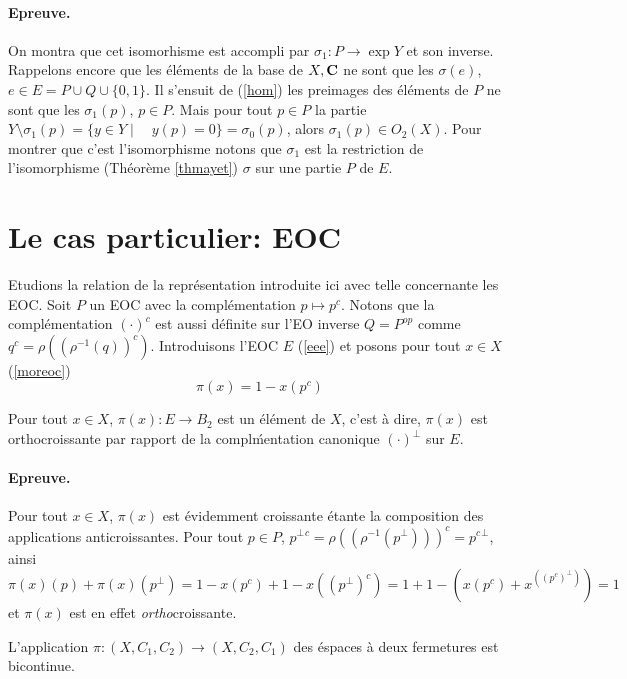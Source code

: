 \paragraph{Epreuve.} On montra que cet isomorhisme est 
accompli par $\sigma_1:P\to\exp Y$ et son inverse. Rappelons encore 
que les \'el\'ements de la base de $X,{\bf C}$ ne sont que les 
$\sigma(e)$, $e\in E=P\cup Q\cup \{0,1\}$.  Il s'ensuit de 
(\ref{hom}) les preimages des \'el\'ements de $P$ ne sont que les 
$\sigma_1(p)$, $p\in P$. Mais pour tout $p\in P$ la partie 
$Y\setminus\sigma_1(p)=\{y\in Y\mid\quad y(p)=0\}=\sigma_0(p)$, 
alors $\sigma_1(p)\in O_2(X)$.  Pour montrer que c'est 
l'isomorphisme notons que $\sigma_1$ est la restriction de 
l'isomorphisme (Th\'eor\`eme \ref{thmayet}) $\sigma$ sur une partie 
$P$ de $E$. 
\endproof 

\section{Le cas particulier: EOC} 

Etudions la relation de la repr\'esentation introduite ici avec 
telle concernante les EOC. Soit $P$ un EOC avec la 
compl\'ementation $p\mapsto p^c$. Notons que la 
compl\'ementation $(\cdot)^c$ est aussi d\'efinite sur 
l'EO inverse $Q=P^{op}$ comme $q^c=\rho((\rho^{-1}(q))^c)$. 
Introduisons l'EOC $E$ (\ref{eee}) et posons pour tout $x\in X$ 
(\ref{moreoc}) \begin{equation} \pi(x)=1-x(p^c) \label{pie} 
\end{equation} 

\begin{lemma} Pour tout $x\in X$, $\pi(x):E\to B_2$ est un 
\'el\'ement de $X$, c'est \`a dire, $\pi(x)$ est orthocroissante 
par rapport de la compl\'mentation canonique $(\cdot)^\perp$ sur 
$E$. 
\end{lemma} 

\paragraph{Epreuve.} Pour tout $x\in X$, $\pi(x)$ est \'evidemment 
croissante \'etante la composition des applications 
anticroissantes. Pour tout $p\in P$, $p^\perp{}^c = 
\rho((\rho^{-1}(p^\perp)))^c = p^c{}^\perp$, ainsi 
$\pi(x)(p)+\pi(x)(p^\perp) = 1-x(p^c)+1-x((p^\perp)^c) = 
1+1-(x(p^c)+x^((p^c)^\perp)) = 1$ et $\pi(x)$ est en effet {\em 
ortho}croissante.  
\endproof 

\begin{lemma} L'application $\pi:(X,C_1,C_2)\to (X,C_2,C_1)$ des 
\'espaces \`a deux fermetures est bicontinue. \label{lbicont} 
\end{lemma} 

